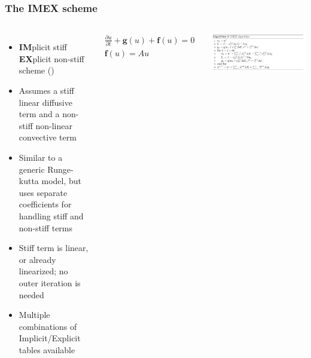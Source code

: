     \begin{frame}
    \frametitle{The IMEX scheme}
    
    \begin{columns}
    
    
    \begin{itemize}
        \item \textbf{IM}plicit stiff \textbf{EX}plicit non-stiff scheme (\cite{bib:cavaglieri})
        \item Assumes a stiff linear diffusive term and a non-stiff non-linear convective term
        \item Similar to a generic Runge-kutta model, but uses separate coefficients for handling stiff and non-stiff terms
        \item Stiff term is linear, or already linearized; no outer iteration is needed
        \item Multiple combinations of Implicit/Explicit tables available %
    \end{itemize}
    
    
    \begin{align*}
        \frac{\partial u}{\partial t} + \mathbf{g}(u) + \mathbf{f}(u) = 0 \\
        \mathbf{f}(u) = A u
    \end{align*}
    
    \includegraphics[width=\textwidth]{images/basic_imex.png}
    
    
    \end{columns}
    
    \end{frame}
    
    
